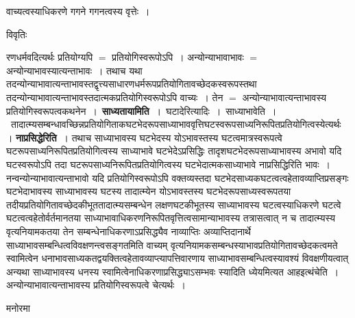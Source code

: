\documentclass[10pt, openany]{book}
\begin{document}
{वाच्यत्वस्याधिकरणे गगने गगनत्वस्य वृत्तेः~।
\newpage
\begin{center}     विवृतिः \end{center}
रणधर्मवदित्यर्थः प्रतियोग्यपि $=$ प्रतियोगिस्वरूपोऽपि~। अन्योन्याभावाभावः $=$ अन्योन्याभावस्यात्यन्ताभावः~। तथाच यथा
तदन्योन्याभावात्यन्ताभावस्तद्वृत्त्यसाधारणधर्मरूपप्रतियोगितावच्छेदकस्वरूपस्तथा तदन्योन्याभावात्यन्ताभावस्तदात्मकप्रतियोगिस्वरूपोऽपि वाच्यः~। तेन $=$ अन्योन्याभावात्यन्ताभावस्य प्रतियोगिस्वरूपत्वकथनेन~।~\textbf{\qt साध्यतायामिति~}।~घटादेरित्यादिः~।~{\qt साध्याभावेति~।}~तादात्म्यसम्बन्धावच्छिन्नप्रतियोगिताकघटभेदरूपसाध्याभाववृत्तिघटस्वरूपसाध्यनिरूपितप्रतियोगित्वस्येत्यर्थः~। \textbf{\qt नाप्रसिद्धेरिति~}। तथाच
साध्याभावस्य घटभेदस्य योऽभावस्तस्य घटत्वमात्रस्वरूपत्वे घटरूपसाध्यनिरूपितप्रतियोगित्वस्य साध्याभावे घटभेदेऽप्रसिद्धिः तादृशघटभेदरूपसाध्याभावस्य अभावो यदि घटस्वरूपोऽपि तदा घटरूपसाध्यनिरूपितप्रतियोगित्वस्य घटभेदात्मकसाध्याभावे नाप्रसिद्धिरिति भावः~। नन्वन्योन्याभावात्यन्ताभावो यदि प्रतियोगिस्वरूपोऽपि वक्तव्यस्तदा घटभेदसाध्यकघटत्वत्वहेतावव्याप्तिप्रसङ्गः घटभेदाभावस्य साध्याभावस्य घटस्य तादात्म्येन योऽभावस्तस्य घटभेदरूपसाध्यस्वरूपतया तदीयप्रतियोगितावच्छेदकीभूततादात्म्यसम्बन्धेन लक्षणघटकीभूतस्य साध्याभावस्य घटत्वस्याधिकरणे घटत्वे घटत्वत्वहेतोर्वर्तमानतया साध्याभावाधिकरणनिरूपितवृत्तित्वसामान्याभावस्य तत्रासत्वात् न च तादात्म्यस्य वृत्यनियामकतया तेन सम्बन्धेनाधिकरणाऽप्रसिद्ध्यैव नाव्याप्तिः
अव्याप्तिदानार्थे साध्याभावसम्बन्धित्वविवक्षणन्त्वसङ्गतमिति वाच्यम् वृत्यनियामकसम्बन्धस्याभावप्रतियोगितावच्छेदकत्वमते स्वामित्वेन धनाभावसाध्यकतद्वयक्तित्वहेतावव्याप्त्यापत्तिवारणाय साध्याभावसम्बन्धित्वस्यावश्यं विवक्षणीयत्वात् अन्यथा साध्याभावस्य धनस्य स्वामित्वेनाधिकरणाप्रसिद्ध्याऽसम्भवः स्यादिति ध्येयमित्यत आह\textendash  इत्थंचेति~। अन्योन्याभावात्यन्ताभावस्य प्रतियोगिस्वरूपत्वे चेत्यर्थः~।
\begin{center}   मनोरमा  \end{center}

}
\end{document}
